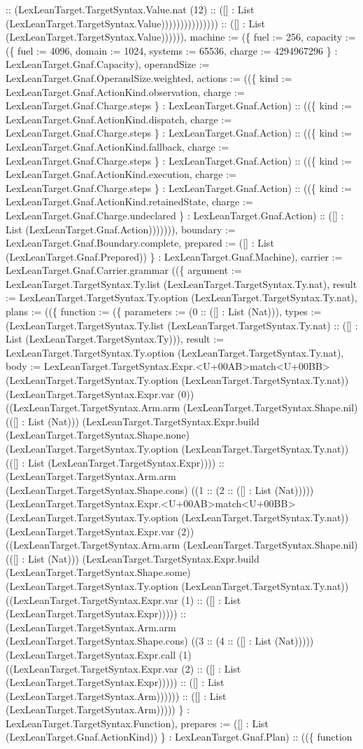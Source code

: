 \documentclass[11pt]{article}
\begin{document}
:: (LexLeanTarget.TargetSyntax.Value.nat (12) :: ([] : List (LexLeanTarget.TargetSyntax.Value))))))))))))))) :: ([] : List (LexLeanTarget.TargetSyntax.Value)))))), machine := (\{ fuel := 256, capacity := (\{ fuel := 4096, domain := 1024, systems := 65536, charge := 4294967296 \} : LexLeanTarget.Gnaf.Capacity), operandSize := LexLeanTarget.Gnaf.OperandSize.weighted, actions := ((\{ kind := LexLeanTarget.Gnaf.ActionKind.observation, charge := LexLeanTarget.Gnaf.Charge.steps \} : LexLeanTarget.Gnaf.Action) :: ((\{ kind := LexLeanTarget.Gnaf.ActionKind.dispatch, charge := LexLeanTarget.Gnaf.Charge.steps \} : LexLeanTarget.Gnaf.Action) :: ((\{ kind := LexLeanTarget.Gnaf.ActionKind.fallback, charge := LexLeanTarget.Gnaf.Charge.steps \} : LexLeanTarget.Gnaf.Action) :: ((\{ kind := LexLeanTarget.Gnaf.ActionKind.execution, charge := LexLeanTarget.Gnaf.Charge.steps \} : LexLeanTarget.Gnaf.Action) :: ((\{ kind := LexLeanTarget.Gnaf.ActionKind.retainedState, charge := LexLeanTarget.Gnaf.Charge.undeclared \} : LexLeanTarget.Gnaf.Action) :: ([] : List (LexLeanTarget.Gnaf.Action))))))), boundary := LexLeanTarget.Gnaf.Boundary.complete, prepared := ([] : List (LexLeanTarget.Gnaf.Prepared)) \} : LexLeanTarget.Gnaf.Machine), carrier := LexLeanTarget.Gnaf.Carrier.grammar ((\{ argument := LexLeanTarget.TargetSyntax.Ty.list (LexLeanTarget.TargetSyntax.Ty.nat), result := LexLeanTarget.TargetSyntax.Ty.option (LexLeanTarget.TargetSyntax.Ty.nat), plans := ((\{ function := (\{ parameters := (0 :: ([] : List (Nat))), types := (LexLeanTarget.TargetSyntax.Ty.list (LexLeanTarget.TargetSyntax.Ty.nat) :: ([] : List (LexLeanTarget.TargetSyntax.Ty))), result := LexLeanTarget.TargetSyntax.Ty.option (LexLeanTarget.TargetSyntax.Ty.nat), body := LexLeanTarget.TargetSyntax.Expr.<U+00AB>match<U+00BB> (LexLeanTarget.TargetSyntax.Ty.option (LexLeanTarget.TargetSyntax.Ty.nat)) (LexLeanTarget.TargetSyntax.Expr.var (0)) ((LexLeanTarget.TargetSyntax.Arm.arm (LexLeanTarget.TargetSyntax.Shape.nil) (([] : List (Nat))) (LexLeanTarget.TargetSyntax.Expr.build (LexLeanTarget.TargetSyntax.Shape.none) (LexLeanTarget.TargetSyntax.Ty.option (LexLeanTarget.TargetSyntax.Ty.nat)) (([] : List (LexLeanTarget.TargetSyntax.Expr)))) :: (LexLeanTarget.TargetSyntax.Arm.arm (LexLeanTarget.TargetSyntax.Shape.cons) ((1 :: (2 :: ([] : List (Nat))))) (LexLeanTarget.TargetSyntax.Expr.<U+00AB>match<U+00BB> (LexLeanTarget.TargetSyntax.Ty.option (LexLeanTarget.TargetSyntax.Ty.nat)) (LexLeanTarget.TargetSyntax.Expr.var (2)) ((LexLeanTarget.TargetSyntax.Arm.arm (LexLeanTarget.TargetSyntax.Shape.nil) (([] : List (Nat))) (LexLeanTarget.TargetSyntax.Expr.build (LexLeanTarget.TargetSyntax.Shape.some) (LexLeanTarget.TargetSyntax.Ty.option (LexLeanTarget.TargetSyntax.Ty.nat)) ((LexLeanTarget.TargetSyntax.Expr.var (1) :: ([] : List (LexLeanTarget.TargetSyntax.Expr))))) :: (LexLeanTarget.TargetSyntax.Arm.arm (LexLeanTarget.TargetSyntax.Shape.cons) ((3 :: (4 :: ([] : List (Nat))))) (LexLeanTarget.TargetSyntax.Expr.call (1) ((LexLeanTarget.TargetSyntax.Expr.var (2) :: ([] : List (LexLeanTarget.TargetSyntax.Expr))))) :: ([] : List (LexLeanTarget.TargetSyntax.Arm)))))) :: ([] : List (LexLeanTarget.TargetSyntax.Arm))))) \} : LexLeanTarget.TargetSyntax.Function), prepares := ([] : List (LexLeanTarget.Gnaf.ActionKind)) \} : LexLeanTarget.Gnaf.Plan) :: ((\{ function 
\end{document}
